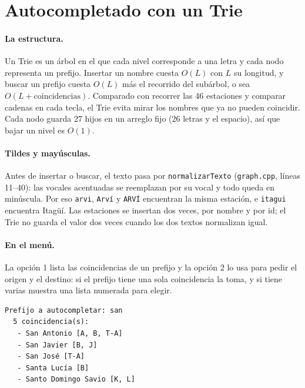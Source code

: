 \documentclass[11pt,a4paper]{article}
\newcommand{\arch}[1]{\texttt{#1}}
\begin{document}
\section{Autocompletado con un Trie}

\paragraph{La estructura.}
Un Trie es un árbol en el que cada nivel corresponde a una letra y cada nodo
representa un prefijo. Insertar un nombre cuesta $O(L)$ con $L$ su longitud, y
buscar un prefijo cuesta $O(L)$ más el recorrido del subárbol, o sea
$O(L + \text{coincidencias})$. Comparado con recorrer las 46 estaciones y comparar
cadenas en cada tecla, el Trie evita mirar los nombres que ya no pueden coincidir.
Cada nodo guarda 27 hijos en un arreglo fijo (26 letras y el espacio), así que
bajar un nivel es $O(1)$.



\paragraph{Tildes y mayúsculas.}
\begin{sloppypar}
Antes de insertar o buscar, el texto pasa por \arch{normalizarTexto}
(\arch{graph.cpp}, líneas 11--40): las vocales acentuadas se reemplazan por su
vocal y todo queda en minúscula. Por eso \arch{arvi}, \arch{Arví} y \arch{ARVÍ}
encuentran la misma estación, e \arch{itagui} encuentra Itagüí. Las estaciones se
insertan dos veces, por nombre y por id; el Trie no guarda el valor dos veces
cuando los dos textos normalizan igual.
\end{sloppypar}

\paragraph{En el menú.}
La opción 1 lista las coincidencias de un prefijo y la opción 2 lo usa para pedir
el origen y el destino: si el prefijo tiene una sola coincidencia la toma, y si
tiene varias muestra una lista numerada para elegir.

\begin{lstlisting}[style=term]
Prefijo a autocompletar: san
  5 coincidencia(s):
   - San Antonio [A, B, T-A]
   - San Javier [B, J]
   - San José [T-A]
   - Santa Lucía [B]
   - Santo Domingo Savio [K, L]
\end{lstlisting}
\end{document}
